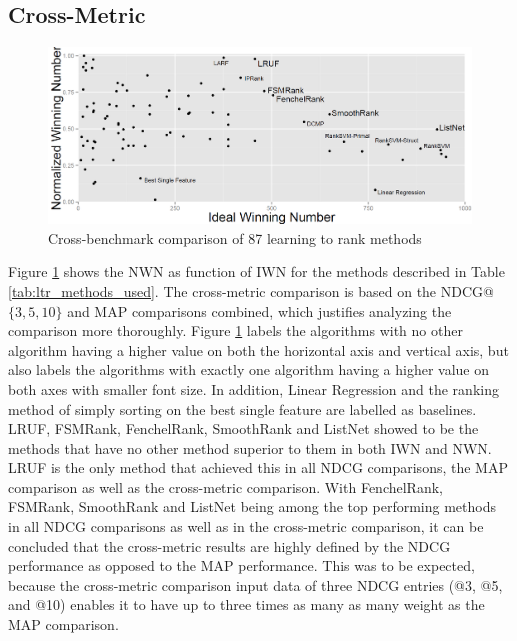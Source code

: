 \documentclass{sig-alternate}
\begin{document}
\subsection{Cross-Metric}
\begin{figure}
\centering
\includegraphics[scale=0.21]{gfx/combined_normalized_winnum}
\caption{Cross-benchmark comparison of 87 learning to rank methods}
\label{fig:normalized_winning_number_all}
\end{figure}
Figure \ref{fig:normalized_winning_number_all} shows the NWN as function of IWN for the methods described in Table \ref{tab:ltr_methods_used}. The cross-metric comparison is based on the NDCG@$\{3,5,10\}$ and MAP comparisons combined, which justifies analyzing the comparison more thoroughly. Figure \ref{fig:normalized_winning_number_all} labels the algorithms with no other algorithm having a higher value on both the horizontal axis and vertical axis, but also labels the algorithms with exactly one algorithm having a higher value on both axes with smaller font size. In addition, Linear Regression and the ranking method of simply sorting on the best single feature are labelled as baselines.\\

LRUF, FSMRank, FenchelRank, SmoothRank and ListNet showed to be the methods that have no other method superior to them in both IWN and NWN. LRUF is the only method that achieved this in all NDCG comparisons, the MAP comparison as well as the cross-metric comparison. With FenchelRank, FSMRank, SmoothRank and ListNet being among the top performing methods in all NDCG comparisons as well as in the cross-metric comparison, it can be concluded that the cross-metric results are highly defined by the NDCG performance as opposed to the MAP performance. This was to be expected, because the cross-metric comparison input data of three NDCG entries (@3, @5, and @10) enables it to have up to three times as many as many weight as the MAP comparison.\\
\end{document}
